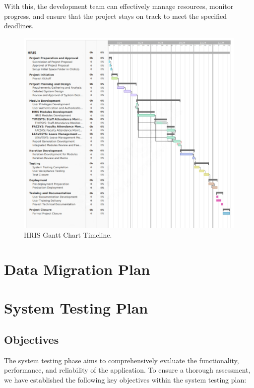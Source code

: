     With this, the development team can effectively manage resources, monitor progress, and ensure that the project stays on track to meet the specified deadlines.

    \begin{figure}[H]
        \centering
        \includegraphics[width=1\linewidth]{figures/fig-5.png}
        \caption{HRIS Gantt Chart Timeline.}
        \label{fig:enter-label}
    \end{figure}

\section{Data Migration Plan}

\section{System Testing Plan}

    \subsection{Objectives}

    The system testing phase aims to comprehensively evaluate the functionality, performance, and reliability of the application. To ensure a thorough assessment, we have established the following key objectives within the system testing plan:
    
